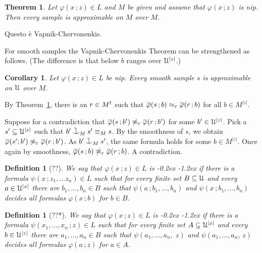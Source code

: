 \documentclass[10pt,openany]{article}
\newcommand{\sbar}[1]{\mkern 1.8mu\overline{\mkern-1.8mu#1\mkern-1mu}\mkern 1mu}
\def\cnonfork{\mathbin{\raise1.8ex\rlap{\kern0.6ex\rule{0.6ex}{0.1ex}}
\rlap{\kern1.1ex\rule{0.1ex}{1.9ex}}\raise-0.3ex\hbox{$\smile$} } }
\def\U{\EuScript U}
\def\phi{\varphi}
\def\epsilon{\varepsilon}
\newcounter{thm}[section]
\theoremstyle{mio}
\newtheorem{theorem}[thm]{Theorem}
\newtheorem{corollary}[thm]{Corollary}
\newtheorem{definition}[thm]{Definition}
\theoremstyle{liscio}
\def\QED{\noindent\nolinebreak[4]\hspace{\stretch{1}}\rlap{\ \ $\Box$}\medskip}
\renewenvironment{proof}[1][Proof]%
{\begin{trivlist}\item[\hskip\labelsep {\bf #1}]}
{\QED\end{trivlist}}
\renewcommand*{\emph}[1]{%
   \kern-0.2ex 
   \smash{\tikz[baseline]
   \node[ rectangle, fill=emphcolor, rounded corners, 
          inner xsep=.3ex, inner ysep=.2ex, anchor=base,
          minimum height = 3ex
         ]{#1};
   }
   \kern-1.2ex 
}
\begin{document}
\begin{theorem}\label{thm_VC}
  Let $\phi(x\,;z)\in L$ and $M$ be given and assume that $\phi(x\,;z)$ is nip.
  Then every sample is approximable on $M$ over $M$.
\end{theorem}

\begin{proof}
  Questo è Vapnik-Chervonenkis.
\end{proof}

For smooth samples the Vapnik-Chervonenkis Theorem can be strengthened as follows. (The difference is that below $b$ ranges over $\U^{|z|}$.)

\begin{corollary}
  Let  $\phi(x\,;z)\in L$ be nip.
  Every smooth sample $s$ is approximable on $\U$ over $M$.
\end{corollary}

\begin{proof}
  By Theorem~\ref{thm_VC}, there is an $r\in M^{\rm f}$ such that $\sbar\phi(s\,;b)\approx_\epsilon\sbar\phi(r\,;b)$ for all $b\in M^{|z|}$.
  
  Suppose for a contradiction that $\sbar\phi(s\,;b')\not\approx_\epsilon\sbar\phi(r\,;b')$ for some $b'\in\U^{|z|}$.
  Pick a  $s'\subseteq\U^{|x|}$ such that $b'\cnonfork_{M}s'\equiv_Ms$.
  By the smoothness of $s$, we obtain $\sbar\phi(s';b')\not\approx_\epsilon\sbar\phi(r\,;b')$.
  As $b'\cnonfork_{M}s'$, the same formula holds for some $b\in M^{|z|}$.
  Once again by smoothness, $\sbar\phi(s\,;b)\not\approx_\epsilon\sbar\phi(r\,;b)$.
  A contradiction.
\end{proof}

\begin{definition}[??]
  We say that $\phi(x\,;z)\in L$ is \emph{distal\/} if there is a formula $\psi(x\,;z_1,\dots z_n)\in L$ such that for every finite set $B\subseteq\U$ and every $a\in\U^{|x|}$ there are $b_1,\dots,b_n\in B$ such that $\psi(a\,;b_1,\dots,b_n)$ and $\psi(x\,;b_1,\dots,b_n)$ decides all formulas $\phi(x\,; b)$ for $b\in B$.\QED
\end{definition}

\begin{definition}[??*]
  We say that $\phi(x\,;z)\in L$ is \emph{distal\/} if there is a formula $\psi(x_1,\dots,x_n\,;z)\in L$ such that for every finite set $A\subseteq\U^{|x|}$ and every $b\in\U^{|z|}$ there are $a_1,\dots,a_n\in B$ such that $\psi(a_1,\dots,a_n,\;z)$ and $\psi(a_1,\dots,a_n,\,z)$ decides all formulas $\phi(a\,; z)$ for $a\in A$.\QED
\end{definition}
\end{document}
